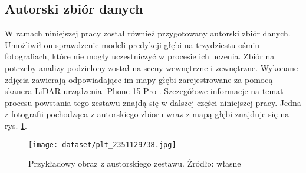 \subsection{Autorski zbiór danych}
W ramach niniejszej pracy został również przygotowany autorski zbiór danych. Umożliwił on sprawdzenie modeli predykcji głębi na trzydziestu ośmiu fotografiach, które nie mogły uczestniczyć w procesie ich uczenia. Zbiór na potrzeby analizy podzielony został na sceny wewnętrzne i zewnętrzne. Wykonane zdjęcia zawierają odpowiadające im mapy głębi zarejestrowane za pomocą skanera LiDAR urządzenia iPhone 15 Pro \cite{chase2022apple}. Szczegółowe informacje na temat procesu powstania tego zestawu znajdą się w dalszej części niniejszej pracy. Jedna z fotografii pochodząca z autorskiego zbioru wraz z mapą głębi znajduje się na rys. \ref{fig:stray-example}.
\begin{figure}[H]
    \centering
    \texttt{[image: dataset/plt\_2351129738.jpg]}
    \caption{Przykładowy obraz z austorskiego zestawu. Źródło: własne}
    \label{fig:stray-example}
\end{figure}

